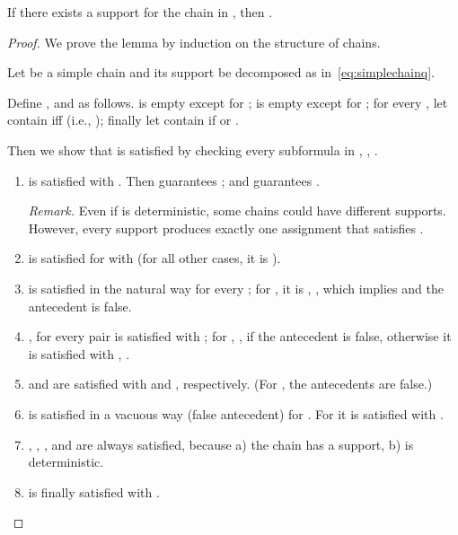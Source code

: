 \documentclass[10pt,a4paper,runningheads]{llncs}
\begin{document}
\begin{lemma}\label{lem:a2f}
  If there exists a support  for the chain
   in , then .
\end{lemma}

\begin{proof}
We prove the lemma by induction on the structure of chains. 





Let  be a simple chain and its support be decomposed  as
in~\eqref{eq:simplechainq}.

Define , and  as follows.
 is empty except for ;
 is empty except for ;
for every , let  contain  iff 
(i.e., );
finally let  contain  if  or .

Then  we show that   is satisfied
by checking every subformula in ,
, .
\begin{enumerate}
\item  is satisfied  with
  .
Then  guarantees ; and  guarantees .

{\em Remark. } Even if  is deterministic, some
chains could have different supports. However, every support produces
exactly one assignment  that
satisfies .

\item  is satisfied for 
with 
   (for all other cases, it is ).

\item  is satisfied in the natural way for every
  ; for , it is , , which
  implies  and the antecedent is
  false.

\item , for every pair  is
  satisfied with ; for , , if  the antecedent is false, otherwise it is satisfied with , .

\item  and  are satisfied
  with   and , respectively.
(For ,  the antecedents are false.)

\item  is satisfied in a vacuous way (false
  antecedent) for . For  it
  is satisfied with . 

\item , ,
  , and  are
  always satisfied, because a) the chain has a support, b)  is deterministic.


\item  is finally satisfied with .
\end{enumerate}

\smallskip





\end{proof}
\end{document}
